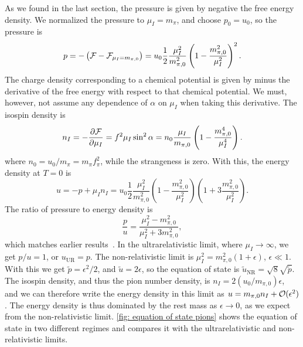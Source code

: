 As we found in the last section, the pressure is given by negative the free energy density. 
We normalized the pressure to $\mu_I = m_{\pi}$, and choose $p_0 = u_0$, so the pressure is
%
\begin{equation}
    \label{pressure leading order chpt}
    p = - \left(\mathcal{F} - \mathcal{F}_{\mu_I=m_{\pi,0}}\right) 
    = u_0  \frac{1}{2} \frac{\mu_I^2}{m_{\pi,0}^2}
    \left(1 - \frac{m_{\pi,0}^2}{\mu_I^2}\right)^2.
\end{equation}
%
The charge density corresponding to a chemical potential is given by minus the derivative of the free energy with respect to that chemical potential. 
We must, however, not assume any dependence of $\alpha$ on $\mu_I$ when taking this derivative.
The isospin density is
%
\begin{equation}
    \label{isospin density}
    n_I = -\pdv{\mathcal{F}}{\mu_I} = f^2 \mu_I \sin^2 \alpha 
    = n_0 \frac{\mu_I}{m_{\pi,0}}    \left(1 - \frac{m_{\pi,0}^4}{\mu_I^4}\right).
\end{equation}
%
where $n_0 = u_0/m_\pi = m_\pi f_\pi^2$, while the strangeness is zero.
With this, the energy density at $T = 0$ is
%
\begin{equation}
    \label{energy density leading order chpt}
    u = - p + \mu_I n_I
    =  u_0 \frac{1}{2} \frac{\mu_I^2}{m_{\pi,0}^2}
    \left(1 - \frac{m_{\pi,0}^2}{\mu_I^2}\right)
    \left(1 + 3 \frac{m_{\pi,0}^2}{\mu_I^2}\right).
\end{equation}
%
The ratio of pressure to energy density is
%
\begin{equation} 
    \label{pressure energy ratio leading order chpt}
    \frac{p}{u} = \frac{\mu_I^2 - m_{\pi,0}^2}{\mu_I^2+3{m_{\pi,0}^2}},
\end{equation}
%
which matches earlier results~\autocite{sonQCDFiniteIsospin2001}.
In the ultrarelativistic limit, where $\mu_I \rightarrow \infty$, we get $p / u = 1$, or $u_\text{UR} = p$.
The non-relativistic limit is $\mu_I^2 = m_{\pi,0}^2(1 + \epsilon)$, $\epsilon \ll 1$.
With this we get $\tilde p = \epsilon^2 / 2 $, and $\tilde u = 2\epsilon$, so the equation of state is $\tilde u_\text{NR} = \sqrt 8 \sqrt{\tilde p}$.
The isospin density, and thus the pion number density, is $n_I = 2 ({u_0}/{m_{\pi,0}}) \epsilon$, and we can therefore write the energy density in this limit as $u = m_{\pi,0} n_I + \mathcal O(\epsilon^2)$.
The energy density is thus dominated by the rest mass as $\epsilon \rightarrow 0$, as we expect from the non-relativistic limit.
\autoref{fig: equation of state pions} shows the equation of state in two different regimes and compares it with the ultrarelativistic and non-relativistic limits.

